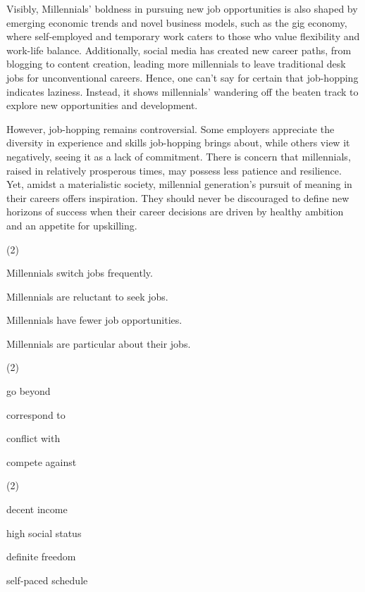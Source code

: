 \documentclass{英语试卷}
\begin{document}
\par Visibly, Millennials' boldness in pursuing new job opportunities is also shaped by emerging economic trends and novel business models, such as the gig economy, where self-employed and temporary work caters to those who value flexibility and work-life balance. Additionally, social media has created new career paths, from blogging to content creation, leading more millennials to leave traditional desk jobs for unconventional careers. Hence, one can't say for certain that job-hopping indicates laziness. Instead, it shows millennials' wandering off the beaten track to explore new opportunities and development.\par
\par However, job-hopping remains controversial. Some employers appreciate the diversity in experience and skills job-hopping brings about, while others view it negatively, seeing it as a lack of commitment. There is concern that millennials, raised in relatively prosperous times, may possess less patience and resilience. Yet, amidst a materialistic society, millennial generation's pursuit of meaning in their careers offers inspiration. They should never be discouraged to define new horizons of success when their career decisions are driven by healthy ambition and an appetite for upskilling.\par
{}
\begin{choices}(2)
  \item Millennials switch jobs frequently.
  \item Millennials are reluctant to seek jobs.
  \item Millennials have fewer job opportunities.
  \item Millennials are particular about their jobs.
\end{choices}
\begin{choices}(2)
  \item go beyond
  \item correspond to
  \item conflict with
  \item compete against
\end{choices}
\begin{choices}(2)
  \item decent income
  \item high social status
  \item definite freedom
  \item self-paced schedule
\end{choices}
\end{document}
